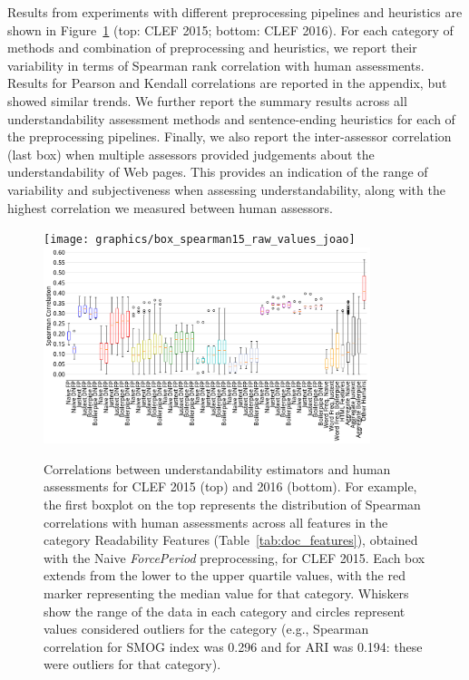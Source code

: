 \documentclass[10pt,a4paper]{article}
\begin{document}
Results from experiments with different preprocessing pipelines and heuristics are shown in Figure~\ref{fig:boxplot_corr_docs} (top: CLEF 2015; bottom: CLEF 2016). 
For each category of methods and combination of preprocessing and heuristics, we report their variability in terms of Spearman rank correlation with human assessments. Results for Pearson and Kendall correlations are reported in the appendix, but showed similar trends. 
We further report the summary results across all understandability assessment methods and sentence-ending heuristics for each of the preprocessing pipelines. 
Finally, we also report the inter-assessor correlation (last box) when multiple assessors provided judgements about the understandability of Web pages. %
This provides an indication of the range of variability and subjectiveness when assessing understandability, along with the highest correlation we measured between human assessors. 

\begin{figure}[h!]
	\centering
	\texttt{[image: graphics/box\_spearman15\_raw\_values\_joao]}\vspace{-7pt}
	\includegraphics[width=0.85\textwidth]{graphics/box_spearman16_raw_values}
	\caption{Correlations between understandability estimators and human assessments for CLEF 2015 (top) and 2016 (bottom). For example, the first boxplot on the top represents the distribution of Spearman correlations with human assessments across all features in the category Readability Features (Table~\ref{tab:doc_features}), obtained with the Naive \textit{ForcePeriod} preprocessing, for CLEF 2015. Each box extends from the lower to the upper quartile values, with the red marker representing the median value for that category. Whiskers show the range of the data in each category and circles represent values considered outliers for the category (e.g., Spearman correlation for SMOG index was 0.296 and for ARI was 0.194: these were outliers for that category).} 
	\label{fig:boxplot_corr_docs}
	\vspace{-10pt}
\end{figure}
\end{document}
